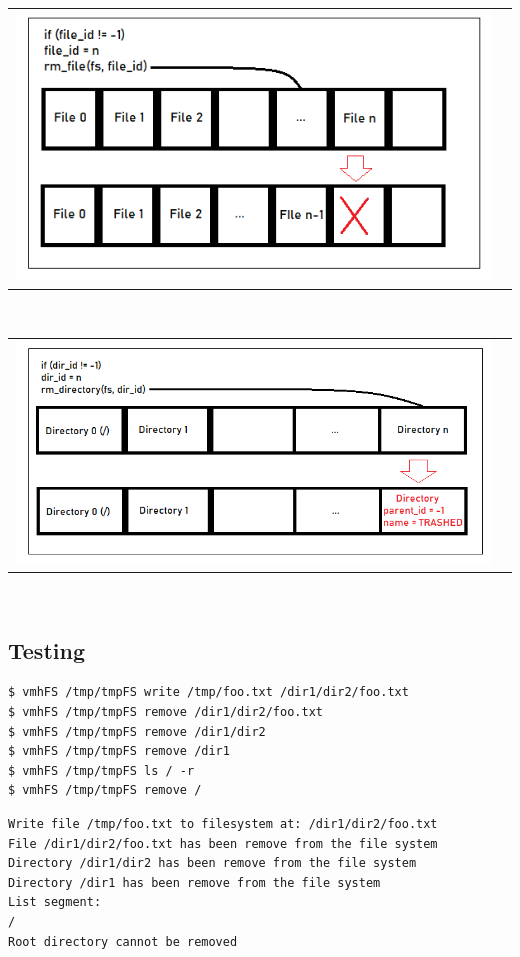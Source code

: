 \begin{center}
    \begin{tabular}{cc}
        \includegraphics{figures/rm_file.png}
    \end{tabular}
\end{center}\\

\begin{center}
    \begin{tabular}{cc}
            \includegraphics[width=16cm]{figures/rm_directory.png}
    \end{tabular}
\end{center}\\

\newpage
\subsection{Testing}
\begin{lstlisting}
$ vmhFS /tmp/tmpFS write /tmp/foo.txt /dir1/dir2/foo.txt
$ vmhFS /tmp/tmpFS remove /dir1/dir2/foo.txt
$ vmhFS /tmp/tmpFS remove /dir1/dir2
$ vmhFS /tmp/tmpFS remove /dir1
$ vmhFS /tmp/tmpFS ls / -r
$ vmhFS /tmp/tmpFS remove /
\end{lstlisting}

\begin{lstlisting}
Write file /tmp/foo.txt to filesystem at: /dir1/dir2/foo.txt
File /dir1/dir2/foo.txt has been remove from the file system
Directory /dir1/dir2 has been remove from the file system
Directory /dir1 has been remove from the file system
List segment:
/
Root directory cannot be removed
\end{lstlisting}

\newpage
